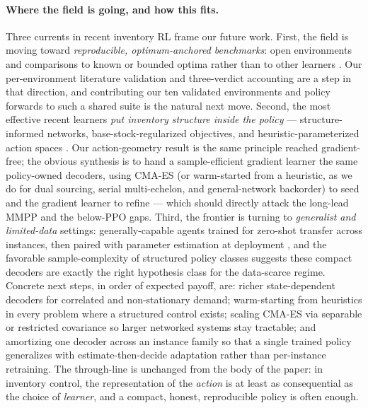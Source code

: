 \paragraph{Where the field is going, and how this fits.}
Three currents in recent inventory RL frame our future work. First, the field is moving toward
\emph{reproducible, optimum-anchored benchmarks}: open environments and comparisons to known or bounded
optima rather than to other learners \citep{alvo2023networks,temizoz2025dcl}. Our per-environment
literature validation and three-verdict accounting are a step in that direction, and contributing our
ten validated environments and policy forwards to such a shared suite is the natural next move.
Second, the most effective recent learners \emph{put inventory structure inside the policy} ---
structure-informed networks, base-stock-regularized objectives, and heuristic-parameterized action
spaces \citep{maggiar2025structure,temizoz2025dcl}. Our action-geometry result is the same principle
reached gradient-free; the obvious synthesis is to hand a sample-efficient gradient learner the same
policy-owned decoders, using CMA-ES (or warm-started from a heuristic, as we do for dual sourcing,
serial multi-echelon, and general-network backorder) to seed and the gradient learner to refine ---
which should directly attack the long-lead MMPP and the below-PPO gaps. Third, the frontier is turning
to \emph{generalist and limited-data} settings: generally-capable agents trained for zero-shot transfer
across instances, then paired with parameter estimation at deployment
\citep{temizoz2024zsg,vanvuchelen2020jrp}, and the favorable sample-complexity of structured policy
classes \citep{xie2024vc} suggests these compact decoders are exactly the right hypothesis class for
the data-scarce regime. Concrete next steps, in order of expected payoff, are: richer state-dependent
decoders for correlated and non-stationary demand; warm-starting from heuristics in every problem where
a structured control exists; scaling CMA-ES via separable or restricted covariance so larger networked
systems stay tractable; and amortizing one decoder across an instance family so that a single trained
policy generalizes with estimate-then-decide adaptation rather than per-instance retraining. The
through-line is unchanged from the body of the paper: in inventory control, the representation of the
\emph{action} is at least as consequential as the choice of \emph{learner}, and a compact, honest,
reproducible policy is often enough.

